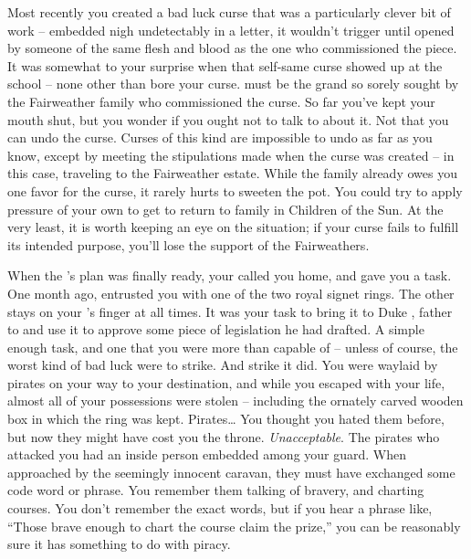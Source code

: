 \documentclass[char]{GL2020}
\begin{document}
Most recently you created a bad luck curse that was a particularly clever bit of work -- embedded nigh undetectably in a letter, it wouldn't trigger until opened by someone of the same flesh and blood as the one who commissioned the piece. It was somewhat to your surprise when that self-same curse showed up at the school – none other than \cInitiate{\full} bore your curse. \cInitiate{\They} must be the grand\cInitiate{\child} so sorely sought by the Fairweather family who commissioned the curse. So far you've kept your mouth shut, but you wonder if you ought not to talk to \cInitiate{} about it. Not that you can undo the curse. Curses of this kind are impossible to undo as far as you know, except by meeting the stipulations made when the curse was created – in this case, traveling to the Fairweather estate. While the family already owes you one favor for the curse, it rarely hurts to sweeten the pot. You could try to apply pressure of your own to get \cInitiate{} to return to \cInitiate{\their} family in Children of the Sun. At the very least, it is worth keeping an eye on the situation; if your curse fails to fulfill its intended purpose, you'll lose the support of the Fairweathers.

When the \cQueen{\Majesty}'s plan was finally ready, your \cQueen{\parent} called you home, and gave you a task. One month ago, \cQueen{\They} entrusted you with one of the two royal signet rings. The other stays on your \cQueen{\parent}'s finger at all times. It was your task to bring it to Duke \cChupStudent{\formal}, father to \cChupStudent{\full} and use it to approve some piece of legislation he had drafted. A simple enough task, and one that you were more than capable of -- unless of course, the worst kind of bad luck were to strike. And strike it did. You were waylaid by pirates on your way to your destination, and while you escaped with your life, almost all of your possessions were stolen -- including the ornately carved wooden box in which the ring was kept. Pirates\ldots{} You thought you hated them before, but now they might have cost you the throne. \emph{Unacceptable}. The pirates who attacked you had an inside person embedded among your guard. When approached by the seemingly innocent caravan, they must have exchanged some code word or phrase. You remember them talking of bravery, and charting courses. You don't remember the exact words, but if you hear a phrase like, ``Those brave enough to chart the course claim the prize,'' you can be reasonably sure it has something to do with piracy. 
\end{document}

